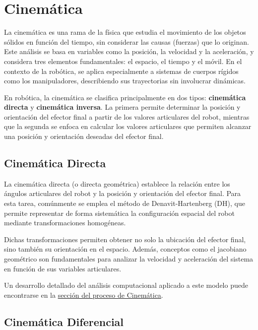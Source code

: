 \section{Cinemática} \label{sec:cinematica}

La cinemática es una rama de la física que estudia el movimiento de los objetos sólidos en función del tiempo, sin considerar las causas (fuerzas) que lo originan. Este análisis se basa en variables como la posición, la velocidad y la aceleración, y considera tres elementos fundamentales: el espacio, el tiempo y el móvil. En el contexto de la robótica, se aplica especialmente a sistemas de cuerpos rígidos como los manipuladores, describiendo sus trayectorias sin involucrar dinámicas.

En robótica, la cinemática se clasifica principalmente en dos tipos: \textbf{cinemática directa} y \textbf{cinemática inversa}. La primera permite determinar la posición y orientación del efector final a partir de los valores articulares del robot, mientras que la segunda se enfoca en calcular los valores articulares que permiten alcanzar una posición y orientación deseadas del efector final.

\subsection{Cinemática Directa}

La cinemática directa (o directa geométrica) establece la relación entre los ángulos articulares del robot y la posición y orientación del efector final. Para esta tarea, comúnmente se emplea el método de Denavit-Hartenberg (DH), que permite representar de forma sistemática la configuración espacial del robot mediante transformaciones homogéneas.

Dichas transformaciones permiten obtener no solo la ubicación del efector final, sino también su orientación en el espacio. Además, conceptos como el jacobiano geométrico son fundamentales para analizar la velocidad y aceleración del sistema en función de sus variables articulares.

Un desarrollo detallado del análisis computacional aplicado a este modelo puede encontrarse en la \hyperref[sec:proceso_cinematica]{sección del proceso de Cinemática}.

\subsection{Cinemática Diferencial}

